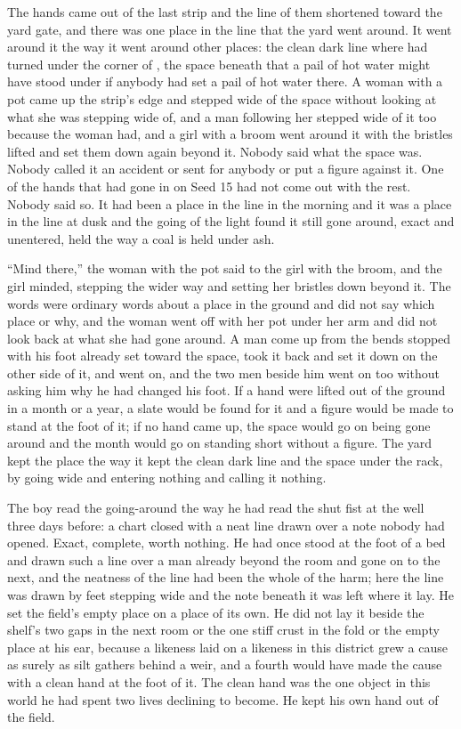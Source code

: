 The hands came out of the last strip and the line of them shortened toward the yard gate, and there was one place in the line that the yard went around. It went around it the way it went around other places: the clean dark line where  had turned under the corner of , the space beneath  that a pail of hot water might have stood under if anybody had set a pail of hot water there. A woman with a pot came up the strip's edge and stepped wide of the space without looking at what she was stepping wide of, and a man following her stepped wide of it too because the woman had, and a girl with a broom went around it with the bristles lifted and set them down again beyond it. Nobody said what the space was. Nobody called it an accident or sent for anybody or put a figure against it. One of the hands that had gone in on Seed 15 had not come out with the rest. Nobody said so. It had been a place in the line in the morning and it was a place in the line at dusk and the going of the light found it still gone around, exact and unentered, held the way a coal is held under ash.

“Mind there,” the woman with the pot said to the girl with the broom, and the girl minded, stepping the wider way and setting her bristles down beyond it. The words were ordinary words about a place in the ground and did not say which place or why, and the woman went off with her pot under her arm and did not look back at what she had gone around. A man come up from the bends stopped with his foot already set toward the space, took it back and set it down on the other side of it, and went on, and the two men beside him went on too without asking him why he had changed his foot. If a hand were lifted out of the ground in a month or a year, a slate would be found for it and a figure would be made to stand at the foot of it; if no hand came up, the space would go on being gone around and the month would go on standing short without a figure. The yard kept the place the way it kept the clean dark line and the space under the rack, by going wide and entering nothing and calling it nothing.

The boy read the going-around the way he had read the shut fist at the well three days before: a chart closed with a neat line drawn over a note nobody had opened. Exact, complete, worth nothing. He had once stood at the foot of a bed and drawn such a line over a man already beyond the room and gone on to the next, and the neatness of the line had been the whole of the harm; here the line was drawn by feet stepping wide and the note beneath it was left where it lay. He set the field's empty place on a place of its own. He did not lay it beside the shelf's two gaps in the next room or the one stiff crust in the fold or the empty place at his ear, because a likeness laid on a likeness in this district grew a cause as surely as silt gathers behind a weir, and a fourth would have made the cause with a clean hand at the foot of it. The clean hand was the one object in this world he had spent two lives declining to become. He kept his own hand out of the field.

